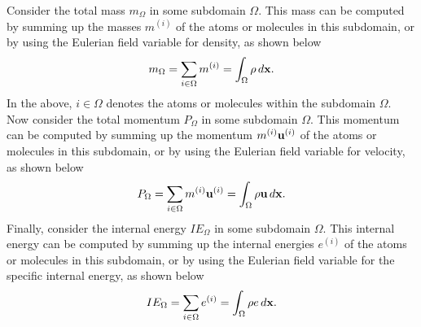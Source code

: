 \documentclass[oneside,a4paper,11pt]{report}
\begin{document}
Consider the total mass $m_\Omega$ in some subdomain $\Omega$. This mass can be computed by summing up the masses $m^{(i)}$ of the atoms or molecules in this subdomain, or by using the Eulerian field variable for density, as shown below
\begin{equation}
   m_\Omega = \sum_{i \in \Omega} m^{(i)} = \int_{\Omega} \rho \, d\mathbf{x}.
\end{equation} 
In the above, $i \in \Omega$ denotes the atoms or molecules within the subdomain $\Omega$. Now consider the total momentum $P_\Omega$ in some subdomain $\Omega$. This momentum can be computed by summing up the momentum $m^{(i)} \mathbf{u}^{(i)}$ of the atoms or molecules in this subdomain, or by using the Eulerian field variable for velocity, as shown below
\begin{equation}
    P_\Omega = \sum_{i \in \Omega} m^{(i)} \mathbf{u}^{(i)} = \int_\Omega \rho \mathbf{u} \, d\mathbf{x}.
\end{equation}
Finally, consider the internal energy $IE_\Omega$ in some subdomain $\Omega$. This internal energy can be computed by summing up the internal energies $e^{(i)}$ of the atoms or molecules in this subdomain, or by using the Eulerian field variable for the specific internal energy, as shown below
\begin{equation}
    IE_\Omega = \sum_{i \in \Omega} e^{(i)} = \int_\Omega \rho e \, d\mathbf{x}.
\end{equation}

\end{document}
